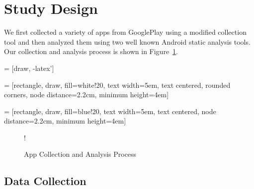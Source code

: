 \section{Study Design}
\label{sec:studydesign}


We first collected a variety of apps from GooglePlay using a modified collection tool and then analyzed them using two well known Android static analysis tools. Our collection and analysis process is shown in Figure~\ref{fig:analysisprocess}.

 = [draw, -latex']

   = [rectangle, draw, fill=white!20, 
    text width=5em, text centered, rounded corners, node distance=2.2cm, minimum height=4em]


 = [rectangle, draw, fill=blue!20, 
    text width=5em, text centered, node distance=2.2cm, minimum height=4em]




	\begin{figure}[h]
	\begin{center}
\resizebox {\columnwidth} {!} {
}
\end{center}
\caption{App Collection and Analysis Process}
\label{fig:analysisprocess}
\end{figure}

\subsection{Data Collection}

